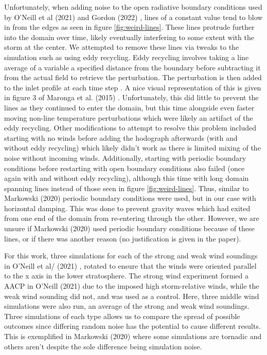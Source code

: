 \documentclass[12pt]{article}
\begin{document}
Unfortunately, when adding noise to the open radiative boundary conditions used by O'Neill et al (2021) and Gordon (2022) \cite{oneill_hydraulic_2021} \cite{gordon_sensitivities_2022}, lines of a constant value tend to blow in from the edges as seen in figure \ref{fig:weird-lines}. These lines protrude further into the domain over time, likely eventually interfering to some extent with the storm at the center. We attempted to remove these lines via tweaks to the simulation such as using eddy recycling. Eddy recycling involves taking a line average of a variable a specified distance from the boundary before subtracting it from the actual field to retrieve the perturbation. The perturbation is then added to the inlet profile at each time step \cite{maronga_parallelized_2015}. A nice visual representation of this is given in figure 3 of Maronga et al. (2015) \cite{maronga_parallelized_2015}. Unfortunately, this did little to prevent the lines as they continued to enter the domain, but this time alongside even faster moving non-line temperature perturbations which were likely an artifact of the eddy recycling. Other modifications to attempt to resolve this problem included starting with no winds before adding the hodograph afterwards (with and without eddy recycling) which likely didn't work as there is limited mixing of the noise without incoming winds. Additionally, starting with periodic boundary conditions before restarting with open boundary conditions also failed (once again with and without eddy recycling), although this time with long domain spanning lines instead of those seen in figure \ref{fig:weird-lines}. Thus, similar to Markowski (2020) \cite{markowski_what_2020} periodic boundary conditions were used, but in our case with horizontal damping. This was done to prevent gravity waves which had exited from one end of the domain from re-entering through the other. However, we are unsure if Markowski (2020) \cite{markowski_what_2020} used periodic boundary conditions because of these lines, or if there was another reason (no justification is given in the paper).

For this work, three simulations for each of the strong and weak wind soundings in O'Neill et al/ (2021) \cite{oneill_hydraulic_2021}, rotated to ensure that the winds were oriented parallel to the x axis in the lower stratosphere. The strong wind experiment formed a AACP in O'Neill (2021) due to the imposed high storm-relative winds, while the weak wind sounding did not, and was used as a control. Here, three middle wind simulations were also run, an average of the strong and weak wind soundings. Three simulations of each type allows us to compare the spread of possible outcomes since differing random noise has the potential to cause different results. This is exemplified in Markowski (2020) \cite{markowski_what_2020} where some simulations are tornadic and others aren't despite the sole difference being simulation noise. 
\end{document}
